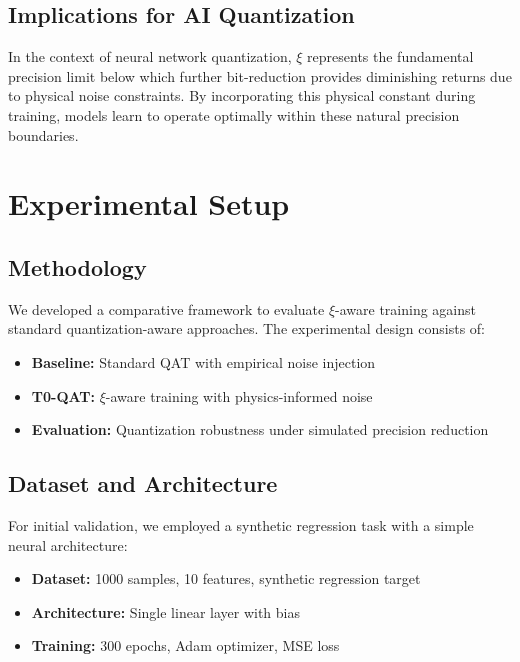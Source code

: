 	\subsection{Implications for AI Quantization}
	
	In the context of neural network quantization, $\xi$ represents the fundamental precision limit below which further bit-reduction provides diminishing returns due to physical noise constraints. By incorporating this physical constant during training, models learn to operate optimally within these natural precision boundaries.
	
	\section{Experimental Setup}
	
	\subsection{Methodology}
	
	We developed a comparative framework to evaluate $\xi$-aware training against standard quantization-aware approaches. The experimental design consists of:
	
	\begin{itemize}
		\item \textbf{Baseline:} Standard QAT with empirical noise injection
		\item \textbf{T0-QAT:} $\xi$-aware training with physics-informed noise
		\item \textbf{Evaluation:} Quantization robustness under simulated precision reduction
	\end{itemize}
	
	\subsection{Dataset and Architecture}
	
	For initial validation, we employed a synthetic regression task with a simple neural architecture:
	
	\begin{itemize}
		\item \textbf{Dataset:} 1000 samples, 10 features, synthetic regression target
		\item \textbf{Architecture:} Single linear layer with bias
		\item \textbf{Training:} 300 epochs, Adam optimizer, MSE loss
	\end{itemize}
	
